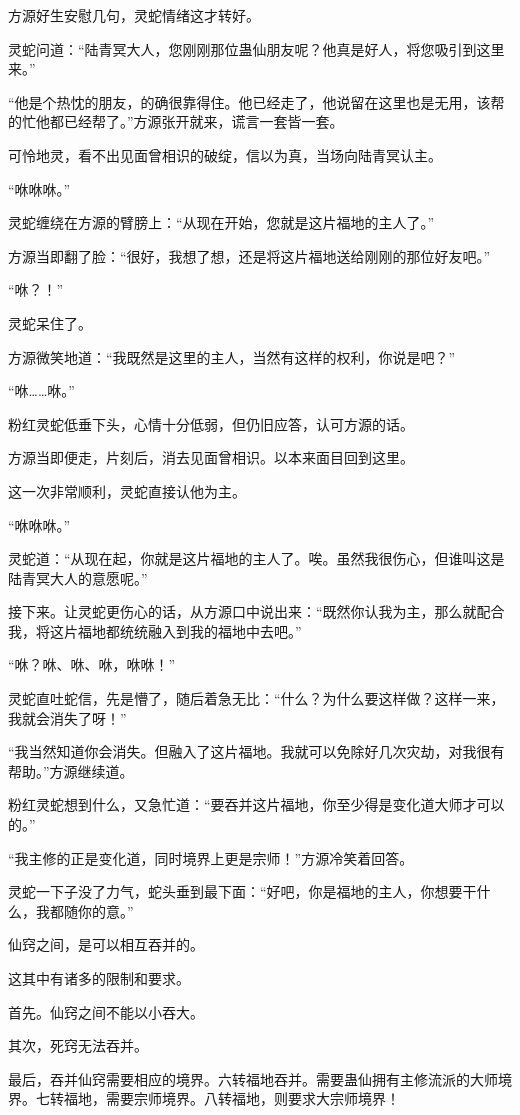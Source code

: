 \begin{this_body}
方源好生安慰几句，灵蛇情绪这才转好。

灵蛇问道：“陆青冥大人，您刚刚那位蛊仙朋友呢？他真是好人，将您吸引到这里来。”

“他是个热忱的朋友，的确很靠得住。他已经走了，他说留在这里也是无用，该帮的忙他都已经帮了。”方源张开就来，谎言一套皆一套。

可怜地灵，看不出见面曾相识的破绽，信以为真，当场向陆青冥认主。

“咻咻咻。”

灵蛇缠绕在方源的臂膀上：“从现在开始，您就是这片福地的主人了。”

方源当即翻了脸：“很好，我想了想，还是将这片福地送给刚刚的那位好友吧。”

“咻？！”

灵蛇呆住了。

方源微笑地道：“我既然是这里的主人，当然有这样的权利，你说是吧？”

“咻……咻。”

粉红灵蛇低垂下头，心情十分低弱，但仍旧应答，认可方源的话。

方源当即便走，片刻后，消去见面曾相识。以本来面目回到这里。

这一次非常顺利，灵蛇直接认他为主。

“咻咻咻。”

灵蛇道：“从现在起，你就是这片福地的主人了。唉。虽然我很伤心，但谁叫这是陆青冥大人的意愿呢。”

接下来。让灵蛇更伤心的话，从方源口中说出来：“既然你认我为主，那么就配合我，将这片福地都统统融入到我的福地中去吧。”

“咻？咻、咻、咻，咻咻！”

灵蛇直吐蛇信，先是懵了，随后着急无比：“什么？为什么要这样做？这样一来，我就会消失了呀！”

“我当然知道你会消失。但融入了这片福地。我就可以免除好几次灾劫，对我很有帮助。”方源继续道。

粉红灵蛇想到什么，又急忙道：“要吞并这片福地，你至少得是变化道大师才可以的。”

“我主修的正是变化道，同时境界上更是宗师！”方源冷笑着回答。

灵蛇一下子没了力气，蛇头垂到最下面：“好吧，你是福地的主人，你想要干什么，我都随你的意。”

仙窍之间，是可以相互吞并的。

这其中有诸多的限制和要求。

首先。仙窍之间不能以小吞大。

其次，死窍无法吞并。

最后，吞并仙窍需要相应的境界。六转福地吞并。需要蛊仙拥有主修流派的大师境界。七转福地，需要宗师境界。八转福地，则要求大宗师境界！


\end{this_body}
